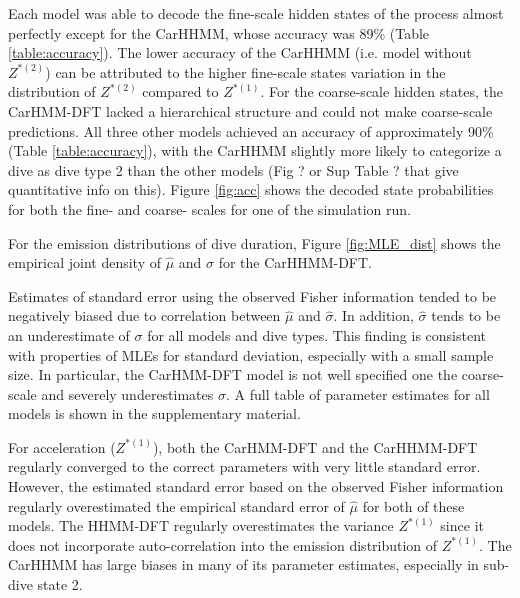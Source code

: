 

\iffalse
Each model was able to decode the fine-scale hidden states of the process almost perfectly except for the CarHHMM, whose accuracy was 89\% (Table \ref{table:accuracy}). The lower accuracy of the CarHHMM (i.e. model without $Z^{*(2)}$)  can be attributed to the higher fine-scale states variation in the distribution of $Z^{*(2)}$ compared to $Z^{*(1)}$. For the coarse-scale hidden states, the CarHMM-DFT lacked a hierarchical structure and could not make coarse-scale predictions. All three other models achieved an accuracy of approximately 90\% (Table \ref{table:accuracy}), with the CarHHMM slightly more likely to categorize a dive as dive type 2 than the other models (Fig ? or Sup Table ? that give quantitative info on this). Figure \ref{fig:acc} shows the decoded state probabilities for both the fine- and coarse- scales for one of the simulation run.

For the emission distributions of dive duration, Figure \ref{fig:MLE_dist} shows the empirical joint density of $\hat \mu$ and $\hat \sigma$ for the CarHHMM-DFT.

Estimates of standard error using the observed Fisher information tended to be negatively biased due to correlation between $\hat \mu$ and $\hat \sigma$. In addition, $\hat \sigma$ tends to be an underestimate of $\sigma$ for all models and dive types. This finding is consistent with properties of MLEs for standard deviation, especially with a small sample size. In particular, the CarHMM-DFT model is not well specified one the coarse-scale and severely underestimates $\sigma$. %
A full table of parameter estimates for all models is shown in the supplementary material.


For acceleration ($Z^{*(1)}$), both the CarHMM-DFT and the CarHHMM-DFT regularly converged to the correct parameters with very little standard error. However, the estimated standard error based on the observed Fisher information regularly overestimated the empirical standard error of $\hat \mu$ for both of these models. 
The HHMM-DFT regularly overestimates the variance $Z^{*(1)}$ since it does not incorporate auto-correlation into the emission distribution of $Z^{*(1)}$. The CarHHMM has large biases in many of its parameter estimates, especially in sub-dive state 2. 

